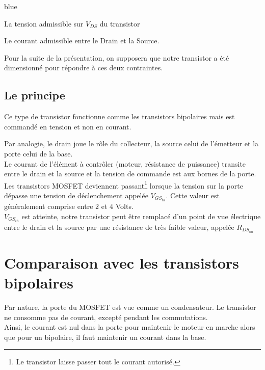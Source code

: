 {     \begin{items}{blue}{\Triangle}
     
       \item La tension admissible sur $V_{DS}$ du transistor
       \item Le courant admissible entre le Drain et la Source.
     \end{items}
     
     Pour la suite de la présentation, on supposera que notre transistor a été dimensionné pour répondre à ces deux contraintes.


     \subsection{Le principe}

     Ce type de transistor fonctionne comme les transistors bipolaires mais est commandé en tension et non en courant.

     Par analogie, le drain joue le rôle du collecteur, la source celui de l'émetteur et la porte celui de la base.\\
     Le courant de l'élément à contrôler (moteur, résistance de puissance) transite entre le drain et la source et la tension de commande est aux bornes de la porte.\\
     
     Les transistors MOSFET deviennent passant\footnote{Le transistor laisse passer tout le courant autorisé.} lorsque la tension sur la porte dépasse une tension de déclenchement appelée $V_{GS_{th}}$.
     Cette valeur est généralement comprise entre $2$ et $4$ Volts.\\

      $V_{GS_{th}}$ est atteinte, notre transistor peut être remplacé d'un point de vue électrique entre le drain et la source par une résistance de très faible valeur, appelée $R_{DS_{on}}$

    \section{Comparaison avec les transistors bipolaires}

    Par nature, la porte du MOSFET est vue comme un condensateur. Le transistor ne consomme pas de courant, excepté pendant les commutations.\\
    Ainsi, le courant est nul dans la porte pour maintenir le moteur en marche alors que pour un bipolaire, il faut maintenir un courant dans la base.\\

}
